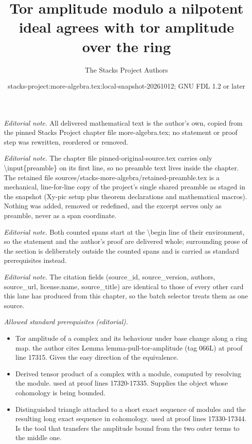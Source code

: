 \documentclass[10pt,a4paper]{amsart}
\title{Tor amplitude modulo a nilpotent ideal agrees with tor amplitude over the ring}
\author{The Stacks Project Authors}
\date{stacks-project:more-algebra.tex:local-snapshot-20261012; GNU FDL 1.2 or later}
\theoremstyle{plain}
\theoremstyle{definition}
\theoremstyle{remark}
\numberwithin{equation}{subsection}
\begin{document}
\maketitle
\setcounter{subsection}{1}
\noindent\textit{Editorial note.} All delivered mathematical text is the author's own, copied from the pinned Stacks Project chapter file more-algebra.tex; no statement or proof step was rewritten, reordered or removed.\par\medskip
\noindent\textit{Editorial note.} The chapter file pinned-original-source.tex carries only \textbackslash{}input\{preamble\} on its first line, so no preamble text lives inside the chapter. The retained file sources/stacks-more-algebra/retained-preamble.tex is a mechanical, line-for-line copy of the project's single shared preamble as staged in the snapshot (Xy-pic setup plus theorem declarations and mathematical macros). Nothing was added, removed or redefined, and the excerpt serves only as preamble, never as a span coordinate.\par\medskip
\noindent\textit{Editorial note.} Both counted spans start at the \textbackslash{}begin line of their environment, so the statement and the author's proof are delivered whole; surrounding prose of the section is deliberately outside the counted spans and is carried as standard prerequisites instead.\par\medskip
\noindent\textit{Editorial note.} The citation fields (source\_id, source\_version, authors, source\_url, license.name, source\_title) are identical to those of every other card this lane has produced from this chapter, so the batch selector treats them as one source.\par\medskip
\noindent\textit{Allowed standard prerequisites (editorial).}\begin{itemize}
\item Tor amplitude of a complex and its behaviour under base change along a ring map. the author cites Lemma lemma-pull-tor-amplitude (tag 066L) at proof line 17315. Gives the easy direction of the equivalence.
\item Derived tensor product of a complex with a module, computed by resolving the module. used at proof lines 17320-17335. Supplies the object whose cohomology is being bounded.
\item Distinguished triangle attached to a short exact sequence of modules and the resulting long exact sequence in cohomology. used at proof lines 17330-17344. Is the tool that transfers the amplitude bound from the two outer terms to the middle one.
\end{itemize}\medskip
\end{document}
